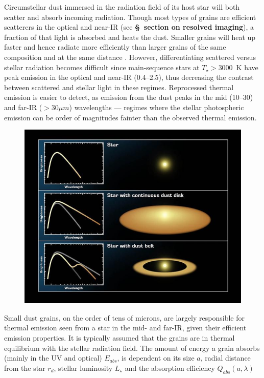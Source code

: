     Circumstellar dust immersed in the radiation field of its host star will both scatter and absorb incoming radiation. Though most types of grains are efficient scatterers in the optical and near-IR (see \textbf{\S~section on resolved imaging}), a fraction of that light is absorbed and heats the dust. Smaller grains will heat up faster and hence radiate more efficiently than larger grains of the same composition and at the same distance \citep{Krivov2010}. However, differentiating scattered versus stellar radiation becomes difficult since main-sequence stars at $T_\star>3000$~K have peak emission in the optical and near-IR (0.4--2.5\micron), thus decreasing the contrast between scattered and stellar light in these regimes. Reprocessed thermal emission is easier to detect, as emission from the dust peaks in the mid (10--30\micron) and far-IR ($>30\mu m$) wavelengths --- regimes where the stellar photospheric emission can be order of magnitudes fainter than the observed thermal emission.  
        
    \begin{figure}
    \centering
    \includegraphics[width=\textwidth]{Ch1/IR_Excess_diagram} 
    \caption[]{}
    \label{fig:PR_Drag_time}
    \end{figure}

    Small dust grains, on the order of tens of microns, are largely responsible for thermal emission seen from a star in the mid- and far-IR, given their efficient emission properties. It is typically assumed that the grains are in thermal equilibrium with the stellar radiation field. The amount of energy a grain absorbs (mainly in the UV and optical) $E_{abs}$, is dependent on its size $a$, radial distance from the star $r_d$, stellar luminosity $L_\star$ and the absorption efficiency $Q_{abs}(a,\lambda)$
    
